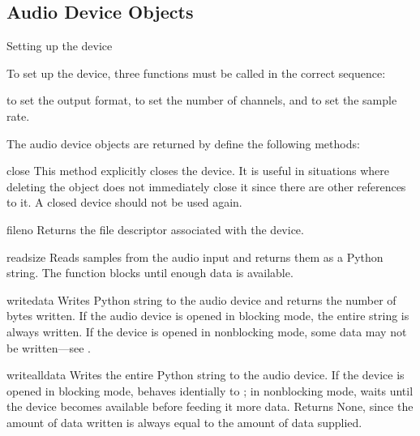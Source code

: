 \subsection{Audio Device Objects \label{ossaudio-device-objects}}

Setting up the device

To set up the device, three functions must be called in the correct
sequence:

 to set the output format,
 to set the number of channels, and
 to set the sample rate.

The audio device objects are returned by  define the
following methods:

\begin{methoddesc}{close}{}
This method explicitly closes the device.  It is useful in situations
where deleting the object does not immediately close it since there are
other references to it.  A closed device should not be used again.
\end{methoddesc}

\begin{methoddesc}{fileno}{}
Returns the file descriptor associated with the device.
\end{methoddesc}

\begin{methoddesc}{read}{size}
Reads  samples from the audio input and returns them as a
Python string.  The function blocks until enough data is available.
\end{methoddesc}

\begin{methoddesc}{write}{data}
Writes Python string  to the audio device and returns the
number of bytes written.  If the audio device is opened in blocking
mode, the entire string is always written.  If the device is opened in
nonblocking mode, some data may not be written---see .
\end{methoddesc}

\begin{methoddesc}{writeall}{data}
Writes the entire Python string  to the audio device.  If the
device is opened in blocking mode, behaves identially to ;
in nonblocking mode, waits until the device becomes available before
feeding it more data.  Returns None, since the amount of data written is
always equal to the amount of data supplied.
\end{methoddesc}

